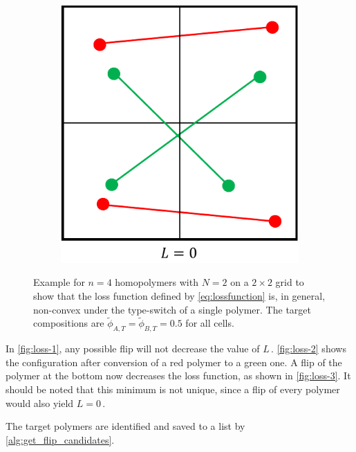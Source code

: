 \documentclass[bachelor,       %
               oneside,        %
               BCOR10mm,       %
               ngerman, english %
               ]{GAUBM}
\begin{document}
\begin{figure}[H]
\begin{subfigure}[b]{0.25\textwidth}
      \caption{}
      \label{fig:loss-2}
  \end{subfigure}
      \hfill
  \begin{subfigure}[b]{0.25\textwidth}
      \centering
      \includegraphics[width=\textwidth]{figures/loss-3.pdf}
      \caption{}
      \label{fig:loss-3}
  \end{subfigure}
     \caption{Example for $n=4$ homopolymers with $N=2$ on a $2\times 2$ grid to show that the loss function defined by \autoref{eq:lossfunction} is, in general, non-convex under the type-switch of a single polymer. The target compositions are $\tilde\phi_{A,T}=\tilde\phi_{B,T}=0.5$ for all cells.}
     \label{fig:loss}
\end{figure}

In \autoref{fig:loss-1}, any possible flip will not decrease the value of $L\,.$ \autoref{fig:loss-2} shows the configuration after conversion of a red polymer to a green one. A flip of the polymer at the bottom now decreases the loss function, as shown in \autoref{fig:loss-3}. It should be noted that this minimum is not unique, since a flip of every polymer would also yield $L=0\,.$

The target polymers are identified and saved to a list by \autoref{alg:get_flip_candidates}.
\end{document}
